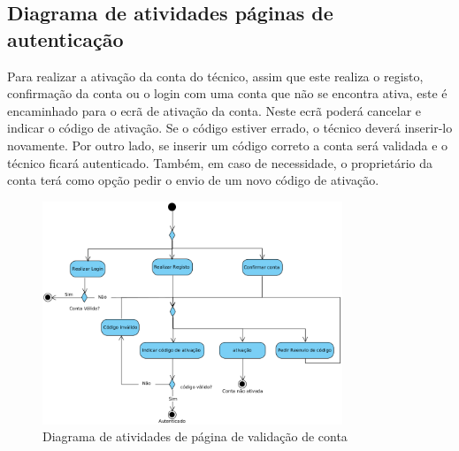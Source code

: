 \newpage

\subsection{Diagrama de atividades páginas de autenticação}

Para realizar a ativação da conta do técnico, assim que este realiza o registo, confirmação da conta ou o login com uma conta que não se encontra ativa, este é encaminhado para o ecrã de ativação da conta. Neste ecrã poderá cancelar e indicar o código de ativação. Se o código estiver errado, o técnico deverá inserir-lo novamente. Por outro lado, se inserir um código correto a conta será validada e o técnico ficará autenticado. Também, em caso de necessidade, o proprietário da conta terá como opção pedir o envio de um novo código de ativação.

\begin{figure}[htb]
  \centering
  \includegraphics[width=0.8\textwidth]{images/diagramas/atividades/diagrama_atividades_autenticação.png}
  \caption{Diagrama de atividades de página de validação de conta}
  \label{fig:39}
\end{figure}

\newpage



